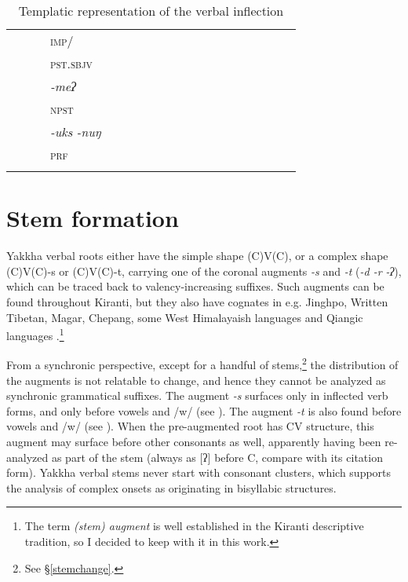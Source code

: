 \begin{landscape}
\begin{table}[p]
{\begin{tabular}{lllllllllllllllllll}
	&										&			&	\scshape imp/&				&						&						&						&						&					&				&			&				&				&			&				&					&				&				\\
	&										&			&	\scshape pst.sbjv&			&						&						&						&						&					&				&			&				&				&			&				&					&				&				\\
	&										&			&	\emph{-meʔ}&			&						&						&						&						&					&				&			&				&				&			&				&					&				&				\\
	&										&			&	\scshape npst&				&						&						&						&						&					&				&			&				&				&			&				&					&				&				\\
	&										&			&	\emph{-uks\,\ti\,-nuŋ}&	&						&						&						&						&					&				&			&				&				&			&				&					&				&				\\
	&										&			&	\scshape prf&				&						&						&						&						&					&				&			&				&				&			&				&					&				&				\\
	\lspbottomrule																																																																																		
\end{tabular}
}
\caption{Templatic representation of the verbal inflection}\label{xyz}
\end{table} 


\end{landscape}


\pagestyle{scrheadings}

\section{Stem formation}\label{stem}

Yakkha verbal roots either have the simple shape (C)V(C), or a complex shape (C)V(C)-s or (C)V(C)-t, carrying one of the coronal augments  \emph{-s} and \emph{-t} (\emph{\ti -d \ti -r \ti -ʔ}), which can be traced back to valency-increasing suffixes. Such augments can be found throughout Kiranti, but they also have cognates in e.g. Jinghpo, Written Tibetan, Magar, Chepang, some West Himalayaish languages and Qiangic languages \citep[457-59]{Matisoff2003Handbook}.\footnote{The term \emph{(stem) augment} is well established in the Kiranti descriptive tradition, so I decided to keep with it in this work.} 

From a synchronic perspective, except for a handful of stems,\footnote{See §\ref{stemchange}.} the distribution of the augments is not relatable to  change, and hence they cannot be analyzed as synchronic grammatical suffixes. The augment \emph{-s} surfaces only in inflected verb forms, and only before vowels and /w/ (see \Next[a]). The augment \emph{-t} is also found before vowels and /w/ (see \Next[b]). When the pre-augmented root has CV structure, this augment may surface before other consonants as well, apparently having been re-analyzed as part of the  stem (always as [ʔ] before C, compare \Next[c] with its citation form). Yakkha verbal stems never start with consonant clusters, which supports the analysis of complex onsets as originating in bisyllabic structures. 

